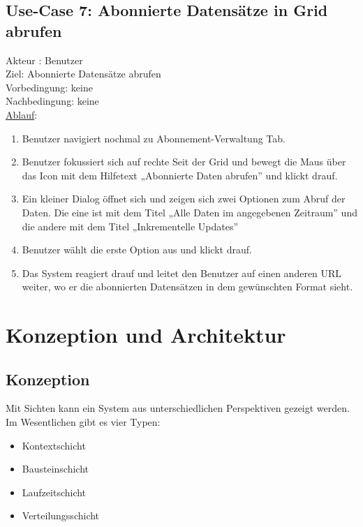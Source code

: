 \documentclass[a4paper,12pt]{scrreprt}
\begin{document}
\section*{\small \textbf{Use-Case 7: Abonnierte Datensätze in Grid abrufen}}
Akteur : Benutzer\\
Ziel: Abonnierte Datensätze abrufen\\
Vorbedingung: keine\\
Nachbedingung: keine\\
\underline{Ablauf}:
\begin{enumerate}
	\item Benutzer navigiert nochmal zu Abonnement-Verwaltung Tab. 
	\item Benutzer fokussiert sich auf rechte Seit der Grid und bewegt die Maus über das Icon mit dem Hilfetext „Abonnierte Daten abrufen” und klickt drauf.
	\item Ein kleiner Dialog öffnet sich und zeigen sich zwei Optionen zum Abruf der Daten. Die eine ist mit dem Titel „Alle Daten im angegebenen Zeitraum” und die andere mit dem Titel „Inkrementelle Updates”
	\item Benutzer wählt die erste Option aus und klickt drauf.
	\item Das System reagiert drauf und leitet den Benutzer auf einen anderen URL weiter, wo er die abonnierten Datensätzen in dem gewünschten Format sieht. 
\end{enumerate}
	
\chapter{Konzeption und Architektur}
\section{Konzeption}
Mit Sichten kann ein System aus unterschiedlichen Perspektiven gezeigt werden.
Im Wesentlichen gibt es vier Typen:
\begin{itemize}
\item Kontextschicht
\item Bausteinschicht
\item Laufzeitschicht
\item Verteilungsschicht
\end{itemize}
\end{document}
